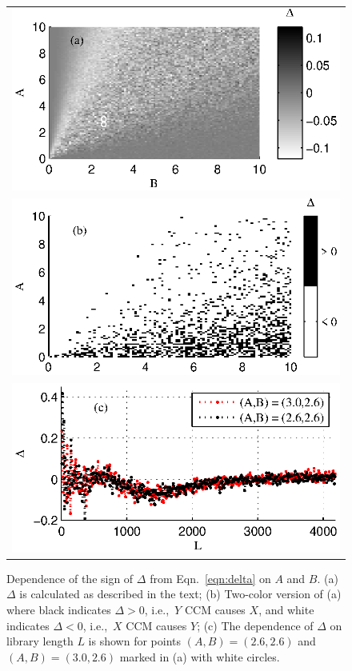 \documentclass[twocolumn,aps,pre,groupedaddress]{revtex4-1}
\begin{document}
\begin{figure}[ht]
\begin{tabular}{l}
\includegraphics[scale=0.8]{LinearEx.eps} \\
\includegraphics[scale=0.8]{LinearEx3Color.eps} \\
\includegraphics[scale=0.8]{LinearExChangeL.eps} \\
\end{tabular}
\caption{Dependence of the sign of $\Delta$ from Eqn.\ \ref{eqn:delta} on $A$ and $B$. (a) $\Delta$ is calculated as described in the text; (b) Two-color version of (a) where black indicates $\Delta>0$, i.e.,\ $Y$ CCM causes $X$, and white indicates $\Delta<0$, i.e.,\ $X$ CCM causes $Y$; (c) The dependence of $\Delta$ on library length $L$ is shown for points $(A,B) = (2.6,2.6)$ and $(A,B)=(3.0,2.6)$ marked in (a) with white circles.}
\label{fig:linearex1}
\end{figure}
\end{document}
